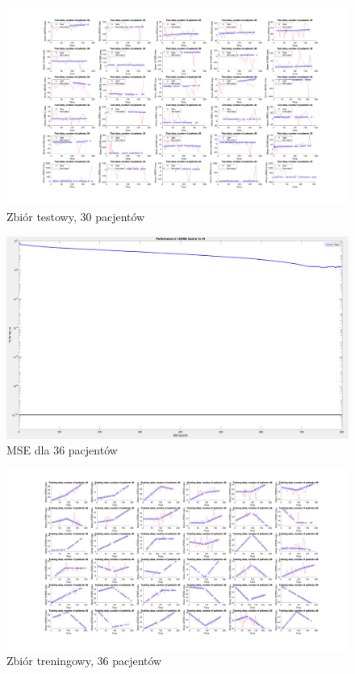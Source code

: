 \documentclass[12pt]{article}
\begin{document}
\begin{figure}[h!]

\centering
\includegraphics[width=1.00\textwidth]{test-cut-30.png}
\caption{Zbiór testowy, 30 pacjentów}

\end{figure}

\begin{figure}[h!]

\centering
\includegraphics[width=1.0\textwidth]{mse-cut-36.png}
\caption{MSE dla 36 pacjentów}

\end{figure}

\begin{figure}[h!]

\centering
\includegraphics[width=1.1\textwidth]{training-cut-36.png}
\caption{Zbiór treningowy, 36 pacjentów}

\end{figure}
\end{document}
